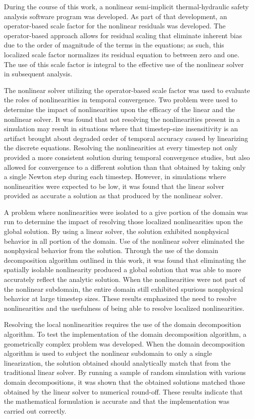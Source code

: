 During the course of this work, a nonlinear semi-implicit thermal-hydraulic safety analysis software program was developed.
As part of that development, an operator-based scale factor for the nonlinear residuals was developed.
The operator-based approach allows for residual scaling that eliminate inherent bias due to the order of magnitude of the terms in the equations; as such, this localized scale factor normalizes its residual equation to between zero and one.
The use of this scale factor is integral to the effective use of the nonlinear solver in subsequent analysis.

The nonlinear solver utilizing the operator-based scale factor was used to evaluate the roles of nonlinearities in temporal convergence.
Two problem were used to determine the impact of nonlinearities upon the efficacy of the linear and the nonlinear solver.
It was found that not resolving the nonlinearities present in a simulation may result in situations where that timestep-size insensitivity is an artifact brought about degraded order of temporal accuracy caused by linearizing the discrete equations.
Resolving the nonlinearities at every timestep not only provided a more consistent solution during temporal convergence studies, but also allowed for convergence to a different solution than that obtained by taking only a single Newton step during each timestep.
However, in simulations where nonlinearities were expected to be low, it was found that the linear solver provided as accurate a solution as that produced by the nonlinear solver.

A problem where nonlinearities were isolated to a give portion of the domain was run to determine the impact of resolving those localized nonlinearities upon the global solution.
By using a linear solver, the solution exhibited nonphysical behavior in all portion of the domain.
Use of the nonlinear solver eliminated the nonphysical behavior from the solution.
Through the use of the domain decomposition algorithm outlined in this work, it was found that eliminating the spatially isolable nonlinearity produced a global solution that was able to more accurately reflect the analytic solution.
When the nonlinearities were not part of the nonlinear subdomain, the entire domain still exhibited spurious nonphysical behavior at large timestep sizes.
These results emphasized the need to resolve nonlinearities and the usefulness of being able to resolve localized nonlinearities.

Resolving the local nonlinearities requires the use of the domain decomposition algorithm. 
To test the implementation of the domain decomposition algorithm, a geometrically complex problem was developed.
When the domain decomposition algorithm is used to subject the nonlinear subdomain to only a single linearization, the solution obtained should analytically match that from the traditional linear solver.
By running a sample of random simulation with various domain decompositions, it was shown that the obtained solutions matched those obtained by the linear solver to numerical round-off.
These results indicate that the mathematical formulation is accurate and that the implementation was carried out correctly.

